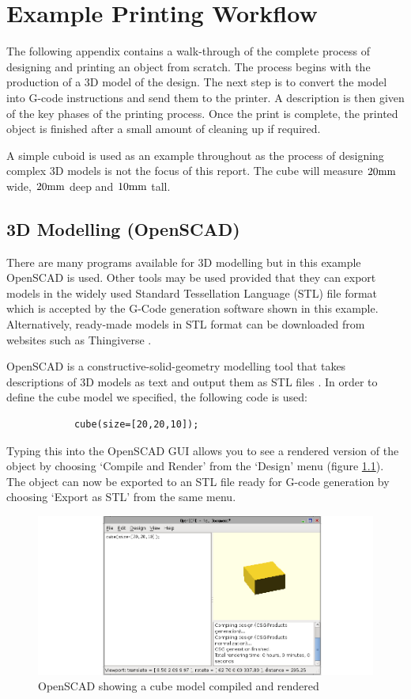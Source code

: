 \chapter{Example Printing Workflow}
	
	The following appendix contains a walk-through of the complete process of
	designing and printing an object from scratch. The process begins with the
	production of a 3D model of the design. The next step is to convert the model
	into G-code instructions and send them to the printer. A description is then
	given of the key phases of the printing process. Once the print is complete,
	the printed object is finished after a small amount of cleaning up if
	required.
	
	A simple cuboid is used as an example throughout as the process of designing
	complex 3D models is not the focus of this report. The cube will measure
	$20\textrm{mm}$ wide, $20\textrm{mm}$ deep and $10\textrm{mm}$ tall.
	
	\section{3D Modelling (OpenSCAD)}
		
		There are many programs available for 3D modelling but in this example
		OpenSCAD is used. Other tools may be used provided that they can export
		models in the widely used Standard Tessellation Language (STL) file format
		which is accepted by the G-Code generation software shown in this example.
		Alternatively, ready-made models in STL format can be downloaded from
		websites such as Thingiverse \cite{thingiverse}.
		
		OpenSCAD is a constructive-solid-geometry modelling tool that takes
		descriptions of 3D models as text and output them as STL files
		\cite{openscad}. In order to define the cube model we specified, the
		following code is used:
		\begin{verbatim}
			cube(size=[20,20,10]);
		\end{verbatim}
		Typing this into the OpenSCAD GUI allows you to see a rendered version of
		the object by choosing `Compile and Render' from the `Design' menu (figure
		\ref{fig:openSCAD}).  The
		object can now be exported to an STL file ready for G-code generation by
		choosing `Export as STL' from the same menu.
		
		\begin{figure}
			\includegraphics[width=1\textwidth]{diagrams/openSCAD.pdf}
			\caption{OpenSCAD showing a cube model compiled and rendered}
			\label{fig:openSCAD}
		\end{figure}
		
